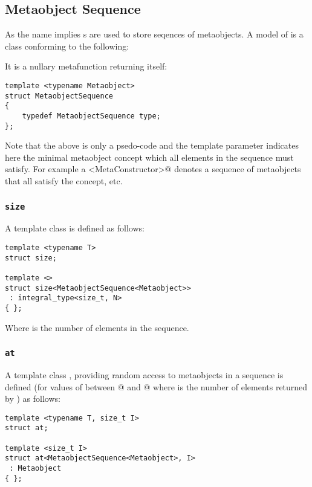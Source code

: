 \subsection{Metaobject Sequence}
\label{concept-MetaobjectSequence}

As the name implies s are used to store seqences
of metaobjects.
A model of  is a class conforming to the following:

It is a nullary metafunction returning itself:

\begin{verbatim}
template <typename Metaobject>
struct MetaobjectSequence
{
	typedef MetaobjectSequence type;
};
\end{verbatim}

Note that the above is only a psedo-code and
the template parameter \verb@Metaobject@ indicates here the minimal
metaobject concept which all elements in the sequence must satisfy.
For example a \verb@MetaobjectSequence<MetaConstructor>@ denotes a sequence
of metaobjects that all satisfy the  concept, etc.

\subsubsection{\texttt{size}}

A template class \verb@size@ is defined as follows:

\begin{verbatim}
template <typename T>
struct size;

template <>
struct size<MetaobjectSequence<Metaobject>>
 : integral_type<size_t, N>
{ };
\end{verbatim}

Where \verb@N@ is the number of elements in the sequence.

\subsubsection{\texttt{at}}

A template class \verb@at@, providing random access to metaobjects in a sequence
is defined (for values of \verb@I@ between @ and @ where \verb@N@
is the number of elements returned by \verb@size@) as follows:

\begin{verbatim}
template <typename T, size_t I>
struct at;

template <size_t I>
struct at<MetaobjectSequence<Metaobject>, I>
 : Metaobject
{ };
\end{verbatim}

